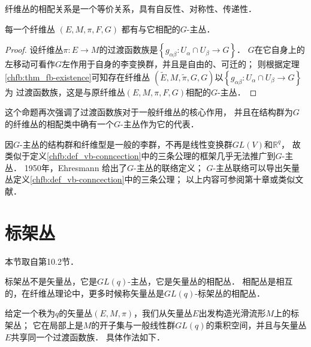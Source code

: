 纤维丛的相配关系是一个等价关系，具有自反性、对称性、传递性．

\begin{proposition}
    每一个纤维丛 $(E, M, \pi, F, G)$ 都有与它相配的$G$-主丛．
\end{proposition} 
\begin{proof}
    设纤维丛$\pi: E \rightarrow M$的过渡函数族是$\left\{g_{\alpha \beta}: U_\alpha \cap U_\beta \rightarrow G\right\}$．
    $G$在它自身上的左移动可看作$G$左作用于自身的李变换群，并且是自由的、可迁的；
    则根据定理\ref{chfb:thm_fb-existence}可知存在纤维丛
    $(\widetilde{E}, M, \tilde{\pi},G, G)$以$\left\{g_{\alpha \beta}: U_\alpha \cap U_\beta \rightarrow G\right\}$为
    过渡函数族，这是与原纤维丛$(E, M, \pi, F, G)$相配的$G$-主丛．
\end{proof}

这个命题再次强调了过渡函数族对于一般纤维丛的核心作用，
并且在结构群为$G$的纤维丛的相配类中确有一个$G$-主丛作为它的代表．


因$G$-主丛的结构群和纤维型是一般的李群，不再是线性变换群$GL(V)$和$\mathbb{R}^q$，
故类似于定义\ref{chfb:def_vb-conncection}中的三条公理的框架几乎无法推广到$G$-主丛．
1950年，Ehresmann 给出了$G$-主丛的联络定义；
$G$-主丛联络可以导出矢量丛定义\ref{chfb:def_vb-conncection}中的三条公理；
以上内容可参阅\parencite{chen-li-2004v2}第十章或类似文献．






\section{标架丛}\label{chfb:sec_frame-bundles}

本节取自\parencite{chen-li-2004v2}第10.2节．

标架丛不是矢量丛，它是$GL(q)$-主丛，它是矢量丛的相配丛．
相配丛是相互的，在纤维丛理论中，更多时候称矢量丛是$GL(q)$-标架丛的相配丛．



给定一个秩为$q$的矢量丛$(E,M,\pi)$，我们从矢量丛$E$出发构造光滑流形$M$上的标架丛；
它在局部上是$M$的开子集与一般线性群$GL(q)$的乘积空间，并且与矢量丛$E$共享同一个过渡函数族．
具体作法如下．

